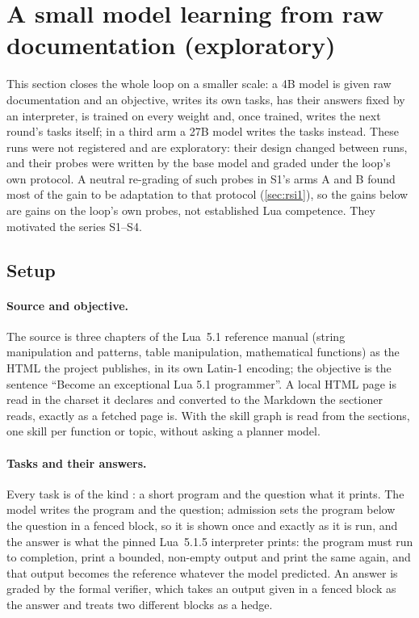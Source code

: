 
\section{A small model learning from raw documentation (exploratory)}\label{sec:documentation}

This section closes the whole loop on a smaller scale: a 4B model is given raw documentation and an
objective, writes its own tasks, has their answers fixed by an interpreter, is trained on every weight
and, once trained, writes the next round's tasks itself; in a third arm a 27B model writes the tasks
instead. These runs were not registered and are exploratory: their design changed between runs, and
their probes were written by the base model and graded under the loop's own protocol. A neutral
re-grading of such probes in S1's arms A and B found most of the gain to be adaptation to that
protocol (\cref{sec:rsi1}), so the gains below are gains on the loop's own probes, not
established Lua competence. They motivated the series S1--S4.

\subsection{Setup}

\paragraph{Source and objective.} The source is three chapters of the Lua~5.1 reference
manual (string manipulation and patterns, table manipulation, mathematical functions) as
the HTML the project publishes, in its own Latin-1 encoding; the objective is the
sentence ``Become an exceptional Lua 5.1 programmer''. A local HTML page is read in the
charset it declares and converted to the Markdown the sectioner reads, exactly as a
fetched page is. With  the skill graph is read from the
sections, one skill per function or topic, without asking a planner model.

\paragraph{Tasks and their answers.} Every task is of the kind : a short
program and the question what it prints. The model writes the program and the question;
admission sets the program below the question in a fenced block, so it is shown once and
exactly as it is run, and the answer is what the pinned Lua~5.1.5 interpreter
prints: the program must run to completion, print a bounded, non-empty output and print
the same again, and that output becomes the reference whatever the model predicted.
An answer is graded by the formal verifier, which takes an output given in a fenced
block as the answer and treats two different blocks as a hedge.

